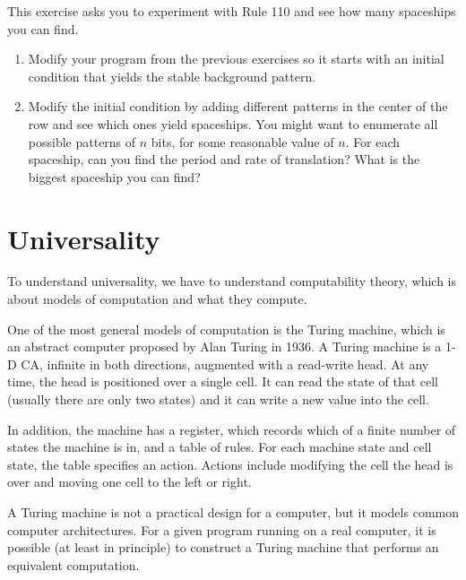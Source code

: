\documentclass[10pt]{book}
\begin{document}
\begin{ex}

This exercise asks you to experiment with Rule 110 and see how
many spaceships you can find.

\begin{enumerate}

\item Modify your program from the previous exercises so it starts
  with an initial condition that yields the stable background
  pattern.

\item Modify the initial condition by adding different patterns in the
  center of the row and see which ones yield spaceships.  You might
  want to enumerate all possible patterns of $n$ bits, for some
  reasonable value of $n$.  For each spaceship, can you find the
  period and rate of translation?  What is the biggest spaceship you
  can find?

\end{enumerate}

\end{ex}


\section{Universality}

To understand universality, we have to understand computability
theory, which is about models of computation and what they compute.

One of the most general models of computation is the Turing machine,
which is an abstract computer proposed by Alan Turing in 1936.  A
Turing machine is a 1-D CA, infinite in both directions, augmented
with a read-write head.  At any time, the head is positioned over a
single cell.  It can read the state of that cell (usually there are
only two states) and it can write a new value into the cell.

In addition, the machine has a register, which records which
of a finite number of states the machine is in, and a table
of rules.  For each machine state and cell state, the table
specifies an action.  Actions include modifying the cell
the head is over and moving one cell to the left or right.

A Turing machine is not a practical design for a computer, but it
models common computer architectures.  For a given program running on
a real computer, it is possible (at least in principle) to construct a
Turing machine that performs an equivalent computation.
\end{document}
